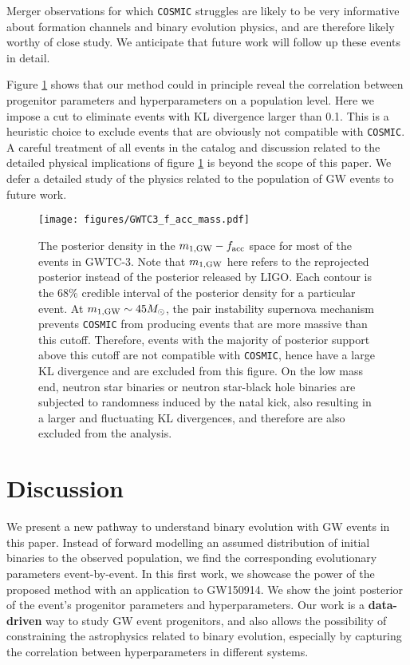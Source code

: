 \documentclass[twocolumn]{aastex631}
\begin{document}
Merger observations for which \texttt{COSMIC} struggles are likely to be very
informative about formation channels and binary evolution physics, and are
therefore likely worthy of close study.  We anticipate that future work will
follow up these events in detail.

Figure \ref{fig:GWTC-3_f_acc_mass} shows that our method could in principle
reveal the correlation between progenitor parameters and hyperparameters on a
population level. Here we impose a cut to eliminate events with KL divergence
larger than 0.1. This is a heuristic choice to exclude events that are obviously
not compatible with \texttt{COSMIC}. A careful treatment of all events in the
catalog and discussion related to the detailed physical implications of figure
\ref{fig:GWTC-3_f_acc_mass} is beyond the scope of this paper.  We defer a
detailed study of the physics related to the population of GW events to future
work.


\begin{figure}
\texttt{[image: figures/GWTC3\_f\_acc\_mass.pdf]}
\caption{ The posterior density in the $m_{1,{\rm GW}}-f_{\rm acc}$ space for
    most of the events in GWTC-3. Note that $m_{1,{\rm GW}}$ here refers to the
    reprojected posterior instead of the posterior released by LIGO. Each
    contour is the $68\%$ credible interval of the posterior density for a
    particular event. At $m_{1,{\rm GW}} \sim 45 M_{\odot}$, the pair
    instability supernova mechanism prevents \texttt{COSMIC} from producing
    events that are more massive than this cutoff. Therefore, events with the
    majority of posterior support above this cutoff are not compatible with
    \texttt{COSMIC}, hence have a large KL divergence and are excluded from this
    figure. On the low mass end, neutron star binaries or neutron star-black
    hole binaries are subjected to randomness induced by the natal kick, also
    resulting in a larger and fluctuating KL divergences, and therefore are also
    excluded from the analysis. }
\label{fig:GWTC-3_f_acc_mass}
\end{figure}

\section{Discussion}
\label{sec:discussion}


We present a new pathway to understand binary evolution with GW events in this
paper. Instead of forward modelling an assumed distribution of initial binaries
to the observed population, we find the corresponding evolutionary parameters
event-by-event. In this first work, we showcase the power of the proposed method
with an application to GW150914. We show the joint posterior of the event's
progenitor parameters and hyperparameters.  Our work is a \textbf{data-driven}
way to study GW event progenitors, and also allows the possibility of
constraining the astrophysics related to binary evolution, especially by
capturing the correlation between hyperparameters in different systems.
\end{document}

